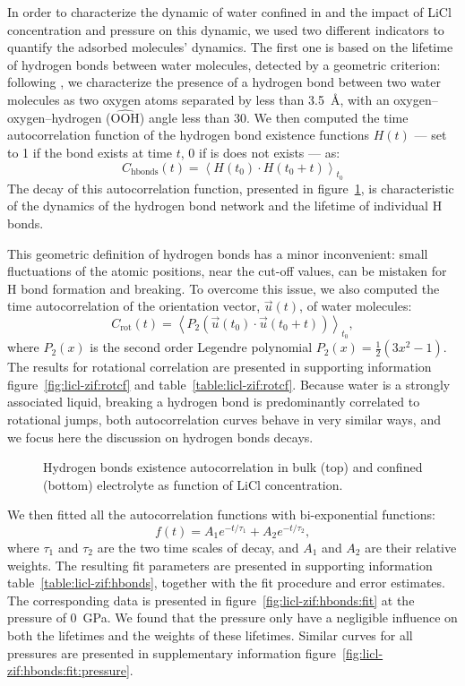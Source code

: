 \documentclass[thesis]{subfiles}
\begin{document}
In order to characterize the dynamic of water confined in  and the impact
of LiCl concentration and pressure on this dynamic, we used two different
indicators to quantify the adsorbed molecules' dynamics. The first one is based
on the lifetime of hydrogen bonds between water molecules, detected by a
geometric criterion: following \citeauthor{Luzar1996}\cite{Luzar1996}, we
characterize the presence of a hydrogen bond between two water molecules as two
oxygen atoms separated by less than \SI{3.5}{\angstrom}, with an
oxygen--oxygen--hydrogen ($\widehat{\text{OOH}}$) angle less than 30\textdegree.
We then computed the time autocorrelation function of the hydrogen bond
existence functions $H(t)$ --- set to 1 if the bond exists at time $t$, 0 if is
does not exists --- as:
\[C_{\text{hbonds}}(t) = \left\langle H(t_0) \cdot H(t_0 + t) \right\rangle_{t_0} \]
The decay of this autocorrelation function, presented in
figure~\ref{fig:licl-zif:hbonds}, is characteristic of the dynamics of the hydrogen bond
network and the lifetime of individual H bonds.

This geometric definition of hydrogen bonds has a minor inconvenient: small
fluctuations of the atomic positions, near the cut-off values, can be mistaken
for H bond formation and breaking. To overcome this issue, we also computed the
time autocorrelation of the orientation vector, $\vec u(t)$, of water molecules:
\[C_{\text{rot}}(t) = \left\langle P_2(\vec u(t_0) \cdot \vec u(t_0 + t)) \right\rangle_{t_0} ,\]
where $P_2(x)$ is the second order Legendre polynomial $P_2(x) = \frac{1}{2}
(3x^2 - 1)$\cite{Fogarty2014}. The results for rotational correlation are
presented in supporting information figure~\ref{fig:licl-zif:rotcf} and
table~\ref{table:licl-zif:rotcf}. Because water is a strongly associated liquid,
breaking a hydrogen bond is predominantly correlated to rotational jumps, both
autocorrelation curves behave in very similar ways, and we focus here the discussion
on hydrogen bonds decays.

\begin{figure}[ht]
    \centering
    
    \caption{Hydrogen bonds existence autocorrelation in bulk (top) and
    confined (bottom) electrolyte as function of LiCl concentration.}
    \label{fig:licl-zif:hbonds}
\end{figure}

We then fitted all the autocorrelation functions with bi-exponential functions:
\[ f(t) = A_1 e^{-t / \tau_1} + A_2 e^{-t / \tau_2}, \]
where $\tau_1$ and $\tau_2$ are the two time scales of decay, and $A_1$ and
$A_2$ are their relative weights. The resulting fit parameters are presented in
supporting information table~\ref{table:licl-zif:hbonds}, together with the fit
procedure and error estimates. The corresponding data is presented in
figure~\ref{fig:licl-zif:hbonds:fit} at the pressure of \SI{0}{GPa}. We found that the
pressure only have a negligible influence on both the lifetimes and the weights
of these lifetimes. Similar curves for all pressures are presented in
supplementary information figure~\ref{fig:licl-zif:hbonds:fit:pressure}.
\end{document}
